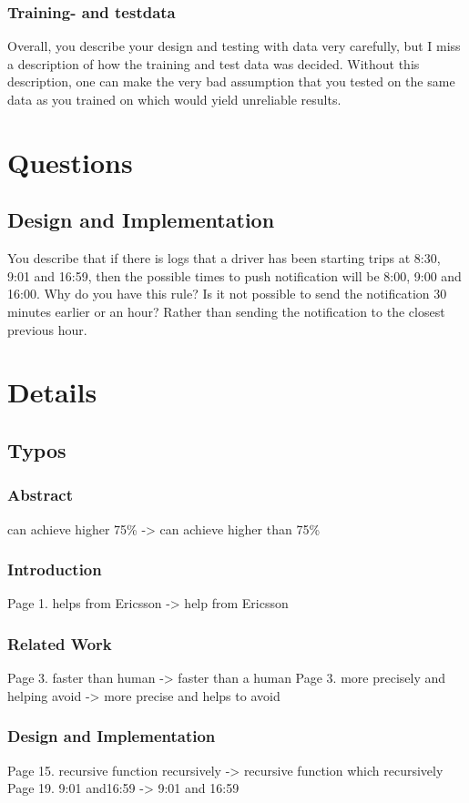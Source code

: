 \documentclass[
10pt, %
a4paper, %
oneside, %
headinclude,footinclude, %
BCOR5mm, %
]{scrartcl}
\begin{document}
{\subsubsection*{Training- and testdata}
Overall, you describe your design and testing with data very carefully, but I miss a description of how the training and test data was decided. Without this description, one can make the very bad assumption that you tested on the same data as you trained on which would yield unreliable results.

\section*{Questions}
\subsection*{Design and Implementation}
You describe that if there is logs that a driver has been starting trips at 8:30, 9:01 and 16:59, then the possible times to push notification will be 8:00, 9:00 and 16:00. Why do you have this rule? Is it not possible to send the notification 30 minutes earlier or an hour? Rather than sending the notification to the closest previous hour.

\section*{Details}
\subsection*{Typos}

\subsubsection*{Abstract}
can achieve higher 75\% -> can achieve higher than 75\%
\subsubsection*{Introduction}
Page 1. helps from Ericsson -> help from Ericsson
\subsubsection*{Related Work}
Page 3. faster than human -> faster than a human
\newline
Page 3. more precisely and helping avoid -> more precise and helps to avoid

\subsubsection*{Design and Implementation}
Page 15. recursive function recursively -> recursive function which recursively
\newline
Page 19. 9:01 and16:59 -> 9:01 and 16:59

}
\end{document}
